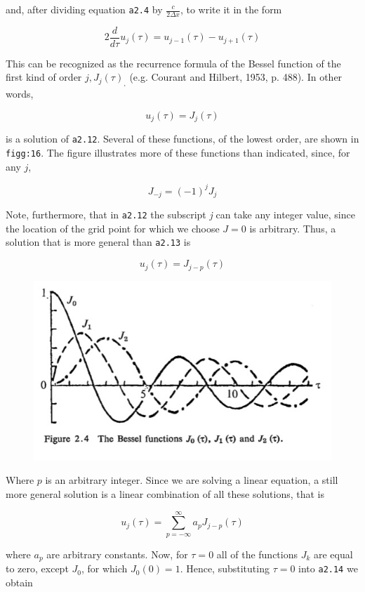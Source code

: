and, after dividing equation \texttt{a2.4} by \(\frac{c}{2\Delta x}\),
to write it in the form

 \[2\frac{d}{d\tau}u_{j}\left( \tau \right) = u_{j - 1}\left( \tau \right) - u_{j + 1}\left( \tau \right)\]

This can be recognized as the recurrence formula of the Bessel function
of the first kind of order \(j,J_{j}\left( \tau \right)_{,}\) (e.g.
Courant and Hilbert, 1953, p. 488). In other words,

 \[u_{j}\left( \tau \right) = J_j\left( \tau \right)\]

is a solution of \texttt{a2.12}. Several of these functions, of the
lowest order, are shown in \texttt{figg:16}. The figure illustrates more
of these functions than indicated, since, for any \(j\),

\[J_{- j} = \left( - 1 \right)^{j}J_{j}\]

Note, furthermore, that in \texttt{a2.12} the subscript \emph{j} can
take any integer value, since the location of the grid point for which
we choose \(J = 0\) is arbitrary. Thus, a solution that is more general
than \texttt{a2.13} is

\[u_{j}\left( \tau \right) = J_{j - p}\left( \tau \right)\]

\begin{figure}
 \centering
 \includegraphics[width = .7 \textwidth]{figs/NM/pic16.jpg}
 \caption{} \label{fig:}
\end{figure}

Where \(p\) is an arbitrary integer. Since we are solving a linear
equation, a still more general solution is a linear combination of all
these solutions, that is

 \[u_{j}\left( \tau \right) = \sum_{p = - \infty}^{\infty}{a_{p}J_{j - p}}\left( \tau \right)\]

where \(a_{p}\) are arbitrary constants. Now, for \(\tau = 0\) all of
the functions \(J_{k}\) are equal to zero, except \(J_{0}\), for which
\(J_{0}\left( 0 \right) = 1\). Hence, substituting \(\tau = 0\) into
\texttt{a2.14} we obtain

